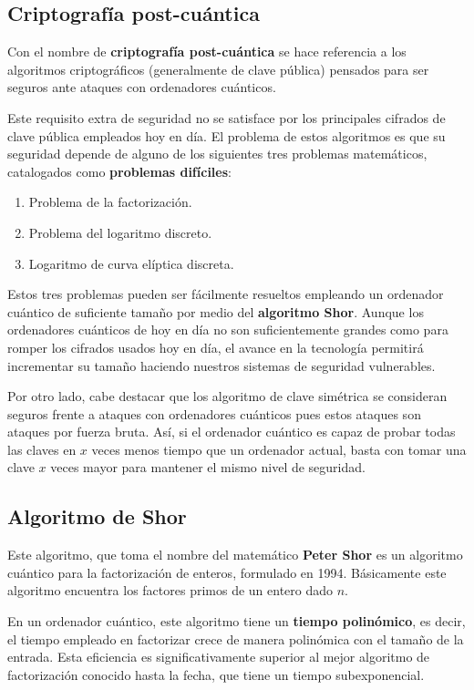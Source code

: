 \documentclass[nochap]{apuntesURJC}
\begin{document}
\subsection{Criptografía post-cuántica}
Con el nombre de \textbf{criptografía post-cuántica} se hace referencia a los algoritmos criptográficos (generalmente de clave pública) pensados para ser seguros ante ataques con ordenadores cuánticos.

Este requisito extra de seguridad no se satisface por los principales cifrados de clave pública empleados hoy en día. El problema de estos algoritmos es que su seguridad depende de alguno de los siguientes tres problemas matemáticos, catalogados como \textbf{problemas difíciles}:
\begin{enumerate}
\item Problema de la factorización.
\item Problema del logaritmo discreto.
\item Logaritmo de curva elíptica discreta.
\end{enumerate}

Estos tres problemas pueden ser fácilmente resueltos empleando un ordenador cuántico de suficiente tamaño por medio del \textbf{algoritmo Shor}. Aunque los ordenadores cuánticos de hoy en día no son suficientemente grandes como para romper los cifrados usados hoy en día, el avance en la tecnología permitirá incrementar su tamaño haciendo nuestros sistemas de seguridad vulnerables.

Por otro lado, cabe destacar que los algoritmo de clave simétrica se consideran seguros frente a ataques con ordenadores cuánticos pues estos ataques son ataques por fuerza bruta. Así, si el ordenador cuántico es capaz de probar todas las claves en $x$ veces menos tiempo que un ordenador actual, basta con tomar una clave $x$ veces mayor para mantener el mismo nivel de seguridad.

\subsection{Algoritmo de Shor}
Este algoritmo, que toma el nombre del matemático \textbf{Peter Shor} es un algoritmo cuántico para la factorización de enteros, formulado en 1994. Básicamente este algoritmo encuentra los factores primos de un entero dado $n$.

En un ordenador cuántico, este algoritmo tiene un \textbf{tiempo polinómico}, es decir, el tiempo empleado en factorizar crece de manera polinómica con el tamaño de la entrada. Esta eficiencia es significativamente superior al mejor algoritmo de factorización conocido hasta la fecha, que tiene un tiempo subexponencial.
\end{document}
